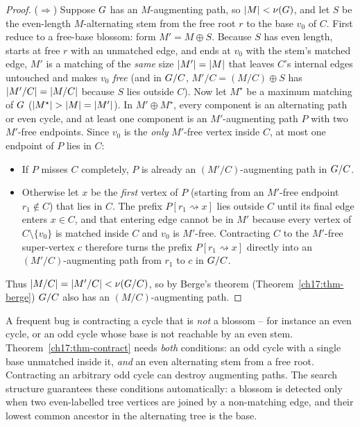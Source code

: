 \begin{proof}
($\Rightarrow$) Suppose $G$ has an $M$-augmenting path, so $\lvert M\rvert<\nu(G)$, and let $S$ be the
even-length $M$-alternating stem from the free root $r$ to the base $v_0$ of $C$. First reduce to a
free-base blossom: form $M' = M \oplus S$. Because $S$ has even length, starts at free $r$ with an
unmatched edge, and ends at $v_0$ with the stem's matched edge, $M'$ is a matching of the \emph{same}
size $\lvert M'\rvert=\lvert M\rvert$ that leaves $C$'s internal edges untouched and makes $v_0$ \emph{free} (and in
$G/C$, $M'/C = (M/C)\oplus S$ has $\lvert M'/C\rvert=\lvert M/C\rvert$ because $S$ lies outside $C$). Now let
$M^\star$ be a maximum matching of $G$ ($\lvert M^\star\rvert>\lvert M\rvert=\lvert M'\rvert$). In $M' \oplus M^\star$,
every component is an alternating path or even cycle, and at least one component is an
$M'$-augmenting path $P$ with two $M'$-free endpoints. Since $v_0$ is the \emph{only} $M'$-free vertex
inside $C$, at most one endpoint of $P$ lies in $C$:
\begin{itemize}
\item If $P$ misses $C$ completely, $P$ is already an $(M'/C)$-augmenting path in $G/C$.
\item Otherwise let $x$ be the \emph{first} vertex of $P$ (starting from an $M'$-free endpoint $r_1\notin C$)
that lies in $C$. The prefix $P[r_1\rightsquigarrow x]$ lies outside $C$ until its final edge enters $x\in C$,
and that entering edge cannot be in $M'$ because every vertex of $C\setminus\{v_0\}$ is matched inside
$C$ and $v_0$ is $M'$-free. Contracting $C$ to the $M'$-free super-vertex $c$ therefore turns the prefix
$P[r_1\rightsquigarrow x]$ directly into an $(M'/C)$-augmenting path from $r_1$ to $c$ in $G/C$.
\end{itemize}
Thus $\lvert M/C\rvert=\lvert M'/C\rvert<\nu(G/C)$, so by Berge's theorem (Theorem~\ref{ch17:thm-berge}) $G/C$
also has an $(M/C)$-augmenting path.
\end{proof}

\begin{trapbox}
A frequent bug is contracting a cycle that is \emph{not} a blossom -- for instance an even cycle, or
an odd cycle whose base is not reachable by an even stem. Theorem~\ref{ch17:thm-contract} needs
\emph{both} conditions: an odd cycle with a single base unmatched inside it, \emph{and} an even
alternating stem from a free root. Contracting an arbitrary odd cycle can destroy augmenting paths.
The search structure guarantees these conditions automatically: a blossom is detected only when two
even-labelled tree vertices are joined by a non-matching edge, and their lowest common ancestor in the
alternating tree is the base.
\end{trapbox}

